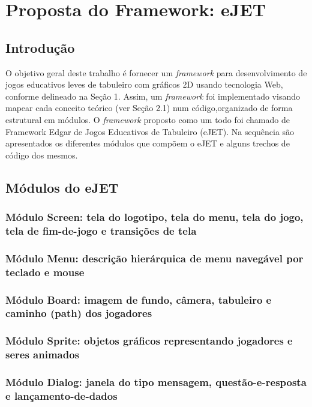 \chapter{Proposta do Framework: eJET}

\section{Introdução}

O objetivo geral deste trabalho é fornecer um \textit{framework} para desenvolvimento de jogos educativos leves de tabuleiro com gráficos 2D usando tecnologia Web, conforme delineado na Seção 1. Assim, um \textit{framework} foi   implementado   visando   mapear   cada   conceito   teórico   (ver   Seção   2.1)   num   código,organizado de forma estrutural em módulos. O  \textit{framework} proposto como um todo foi chamado de Framework Edgar de Jogos Educativos de Tabuleiro (eJET). Na sequência são apresentados os diferentes módulos que compõem o eJET e alguns trechos de código dos mesmos.

\section{Módulos do eJET}

\subsection {Módulo Screen: tela do logotipo, tela do menu, tela do jogo, tela de fim-de-jogo e transições de tela}

\subsection{ Módulo Menu: descrição hierárquica de menu navegável por teclado e mouse}

\subsection{ Módulo Board: imagem de fundo, câmera, tabuleiro e caminho (path) dos jogadores}

\subsection{ Módulo Sprite: objetos gráficos representando jogadores e seres animados}

\subsection{ Módulo Dialog: janela do tipo mensagem, questão-e-resposta e lançamento-de-dados}

